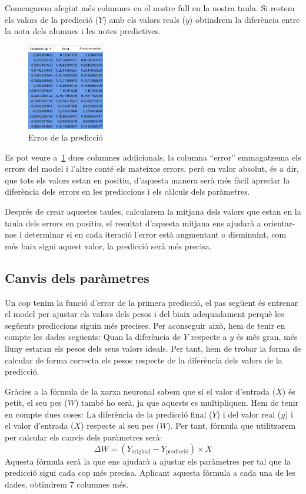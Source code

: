 Començarem afegint més columnes en el nostre full en la nostra taula. Si restem els valors de la predicció ($Y$) amb els valors reals ($y$) obtindrem la diferència entre la nota dels alumnes i les notes predictives.

\begin{figure}[h!]
    \centering
    \includegraphics[width=0.3\textwidth]{./figures/Errors.png}
    \caption{Erros de la predicció}
    \label{f:errors}
\end{figure}

Es pot veure a~\ref{f:errors} dues columnes addicionals, la columna ``error'' emmagatzema els errors del model i l'altre conté els mateixos errors, però en valor absolut, és a dir, que tots els valors estan en positiu, d'aquesta manera serà més fàcil apreciar la diferència dels errors en les prediccions i els càlculs dels paràmetres.

Després de crear aquestes taules, calcularem la mitjana dels valors que estan en la taula dels errors en positiu, el resultat d'aquesta mitjana ens ajudarà a orientar-nos i determinar si en cada iteració l'error està augmentant o disminuint, com més baix sigui aquest valor, la predicció serà més precisa.

\subsection{Canvis dels paràmetres}
Un cop tenim la funció d'error de la primera predicció, el pas següent és entrenar el model per ajustar els valors dels pesos i del biaix adequadament perquè les següents prediccions siguin més precises.
Per aconseguir això, hem de tenir en compte les dades següents: Quan la diferència de $Y$ respecte a $y$ és més gran, més lluny estaran els pesos dels seus valors ideals. Per tant, hem de trobar la forma de calcular de forma correcta els pesos respecte de la diferència dels valors de la predicció.

Gràcies a la fórmula de la xarxa neuronal sabem que si el valor d'entrada ($X$) és petit, el seu pes ($W$) també ho serà, ja que aquests es multipliquen. Hem de tenir en compte dues coses: La diferència de la predicció final ($Y$) i del valor real ($y$) i el valor d'entrada ($X$) respecte al seu pes ($W$). Per tant, fórmula que utilitzarem per calcular els canvis dels paràmetres serà:
$$\Delta W = (Y_{\text{original}} - Y_{\text{predicció}}) \times X$$
Aquesta fórmula serà la que ens ajudarà a ajustar els paràmetres per tal que la predicció sigui cada cop més precisa. Aplicant aquesta fórmula a cada una de les dades, obtindrem 7 columnes més.

